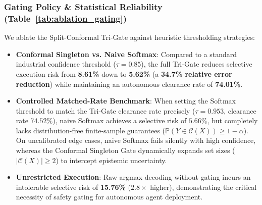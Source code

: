 \documentclass[11pt,a4paper]{article}
\begin{document}
\subsubsection{Gating Policy \& Statistical Reliability (Table~\ref{tab:ablation_gating})}
We ablate the Split-Conformal Tri-Gate against heuristic thresholding strategies:
\begin{itemize}
    \item \textbf{Conformal Singleton vs. Naive Softmax}: Compared to a standard industrial confidence threshold ($\tau = 0.85$), the full Tri-Gate reduces selective execution risk from \textbf{8.61\%} down to \textbf{5.62\%} (a \textbf{34.7\% relative error reduction}) while maintaining an autonomous clearance rate of \textbf{74.01\%}.
    \item \textbf{Controlled Matched-Rate Benchmark}: When setting the Softmax threshold to match the Tri-Gate clearance rate precisely ($\tau = 0.953$, clearance rate $74.52\%$), naive Softmax achieves a selective risk of $5.66\%$, but completely lacks distribution-free finite-sample guarantees ($\mathbb{P}(Y \in \mathcal{C}(X)) \ge 1-\alpha$). On uncalibrated edge cases, naive Softmax fails silently with high confidence, whereas the Conformal Singleton Gate dynamically expands set sizes ($|\mathcal{C}(X)| \ge 2$) to intercept epistemic uncertainty.
    \item \textbf{Unrestricted Execution}: Raw argmax decoding without gating incurs an intolerable selective risk of \textbf{15.76\%} ($2.8\times$ higher), demonstrating the critical necessity of safety gating for autonomous agent deployment.
\end{itemize}
\end{document}
